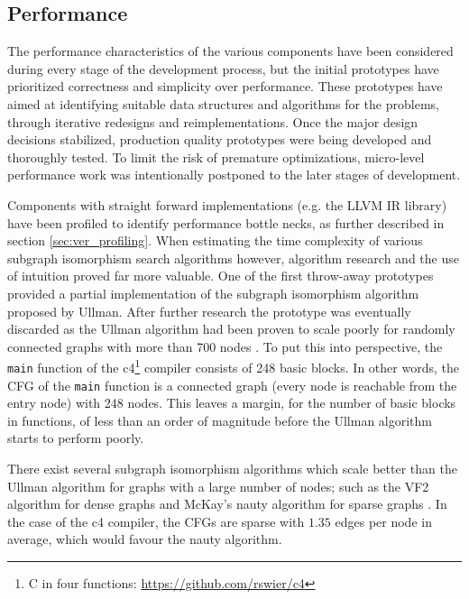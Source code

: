
\subsection{Performance}

The performance characteristics of the various components have been considered during every stage of the development process, but the initial prototypes have prioritized correctness and simplicity over performance. These prototypes have aimed at identifying suitable data structures and algorithms for the problems, through iterative redesigns and reimplementations. Once the major design decisions stabilized, production quality prototypes were being developed and thoroughly tested. To limit the risk of premature optimizations, micro-level performance work was intentionally postponed to the later stages of development.

Components with straight forward implementations (e.g. the LLVM IR library) have been profiled to identify performance bottle necks, as further described in section \ref{sec:ver_profiling}. When estimating the time complexity of various subgraph isomorphism search algorithms however, algorithm research and the use of intuition proved far more valuable. One of the first throw-away prototypes provided a partial implementation of the subgraph isomorphism algorithm proposed by Ullman. After further research the prototype was eventually discarded as the Ullman algorithm had been proven to scale poorly for randomly connected graphs with more than 700 nodes \cite{iso_performance_comparison}. To put this into perspective, the \texttt{main} function of the c4\footnote{C in four functions: \url{https://github.com/rswier/c4}} compiler consists of 248 basic blocks. In other words, the CFG of the \texttt{main} function is a connected graph (every node is reachable from the entry node) with 248 nodes. This leaves a margin, for the number of basic blocks in functions, of less than an order of magnitude before the Ullman algorithm starts to perform poorly.

There exist several subgraph isomorphism algorithms which scale better than the Ullman algorithm for graphs with a large number of nodes; such as the VF2 algorithm for dense graphs and McKay's nauty algorithm for sparse graphs \cite{iso_performance_comparison,subgraph_isomorphism_algorithms}. In the case of the c4 compiler, the CFGs are sparse with $ 1.35 $ edges per node in average, which would favour the nauty algorithm.

